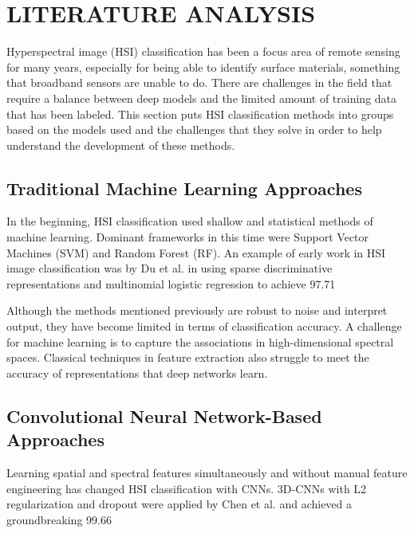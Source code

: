 \chapter{LITERATURE ANALYSIS}

Hyperspectral image (HSI) classification has been a focus area of remote sensing for many years, especially for being able to identify surface materials, something that broadband sensors are unable to do. There are challenges in the field that require a balance between deep models and the limited amount of training data that has been labeled. This section puts HSI classification methods into groups based on the models used and the challenges that they solve in order to help understand the development of these methods.

\section{Traditional Machine Learning Approaches}

In the beginning, HSI classification used shallow and statistical methods of machine learning. Dominant frameworks in this time were Support Vector Machines (SVM) and Random Forest (RF). An example of early work in HSI image classification was by Du et al. in using sparse discriminative representations and multinomial logistic regression to achieve 97.71%

Although the methods mentioned previously are robust to noise and interpret output, they have become limited in terms of classification accuracy. A challenge for machine learning is to capture the associations in high-dimensional spectral spaces. Classical techniques in feature extraction also struggle to meet the accuracy of representations that deep networks learn.

\section{Convolutional Neural Network-Based Approaches}

Learning spatial and spectral features simultaneously and without manual feature engineering has changed HSI classification with CNNs. 3D-CNNs with L2 regularization and dropout were applied by Chen et al. and achieved a groundbreaking 99.66%


